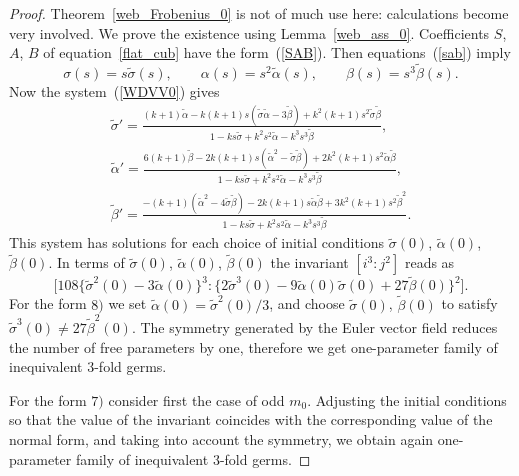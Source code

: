 \documentclass[pdftex]{sigma}
\begin{document}
\begin{proof} Theorem~\ref{web_Frobenius_0} is not of much use here: calculations become very involved.
We prove the existence using Lemma~\ref{web_ass_0}. Coef\/f\/icients $S$, $A$, $B$ of equation~\eqref{flat_cub} have the form~(\ref{SAB}). Then equations~(\ref{sab}) imply
\[
\sigma(s)=s\tilde{\sigma}(s), \qquad \alpha(s)=s^2\tilde{\alpha}(s), \qquad \beta(s)=s^3\tilde{\beta}(s).
\]
Now the system~(\ref{WDVV0}) gives
\begin{gather}
\tilde{\sigma}'=\frac{(k+1)\tilde{\alpha}-k(k+1)s(\tilde{\sigma}\tilde{\alpha}-3\tilde{\beta})+k^2(k+1)s^2\tilde{\sigma}\tilde{\beta}}
{1-ks\tilde{\sigma}+k^2s^2\tilde{\alpha}-k^3s^3\tilde{\beta}},\nonumber\\
\tilde{\alpha}'=\frac{6(k+1)\tilde{\beta}-2k(k+1)s(\tilde{\alpha}^2-\tilde{\sigma}\tilde{\beta})+2k^2(k+1)s^2\tilde{\alpha}\tilde{\beta}}
{1-ks\tilde{\sigma}+k^2s^2\tilde{\alpha}-k^3s^3\tilde{\beta}},\nonumber\\
\tilde{\beta}'=\frac{-(k+1)(\tilde{\alpha}^2-4\tilde{\sigma}\tilde{\beta})-2k(k+1)s\tilde{\alpha}\tilde{\beta}+3k^2(k+1)s^2\tilde{\beta}^2}
{1-ks\tilde{\sigma}+k^2s^2\tilde{\alpha}-k^3s^3\tilde{\beta}}.\label{eq_for_sab}
\end{gather}
This system has solutions for each choice of initial conditions $\tilde{\sigma}(0)$, $\tilde{\alpha}(0)$, $\tilde{\beta}(0)$.
In terms of $\tilde{\sigma}(0)$, $\tilde{\alpha}(0)$, $\tilde{\beta}(0)$ the invariant $ [i^3:j^2 ]$ reads as
\[
\Big[108\big\{\tilde{\sigma}^2(0)-3\tilde{\alpha}(0)\big\}^3:\big\{2\tilde{\sigma}^3(0)-9\tilde{\alpha}(0)\tilde{\sigma}(0)+27\tilde{\beta}(0)\big\}^2\Big].
\]
For the form $8)$ we set $\tilde{\alpha}(0)=\tilde{\sigma}^2(0)/3$,
and choose $\tilde{\sigma}(0)$, $\tilde{\beta}(0)$ to satisfy $\tilde{\sigma}^3(0)\ne 27\tilde{\beta}^2(0)$.
The symmetry generated by the Euler vector f\/ield reduces the number of free parameters by one, therefore we get one-parameter family of inequivalent $3$-fold germs.

For the form $7)$ consider f\/irst the case of odd $m_0$.
Adjusting the initial conditions so that the value of the invariant coincides with the corresponding value of the normal form, and taking into account the symmetry, we obtain again one-parameter family of inequivalent $3$-fold germs.


\end{proof}
\end{document}
